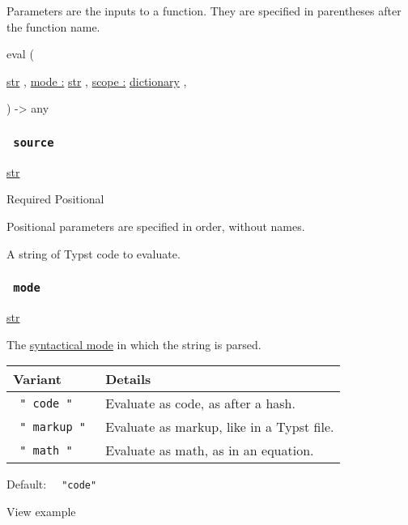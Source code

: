 \label{parameters-tooltip}
Parameters are the inputs to a function. They are specified in
parentheses after the function name.

{ eval } (

{ \href{/docs/reference/foundations/str/}{str} , } {
\hyperref[parameters-mode]{mode :}
\href{/docs/reference/foundations/str/}{str} , } {
\hyperref[parameters-scope]{scope :}
\href{/docs/reference/foundations/dictionary/}{dictionary} , }

) -\textgreater{} { any }

\subsubsection{\texorpdfstring{\texttt{\ source\ }}{ source }}\label{parameters-source}

\href{/docs/reference/foundations/str/}{str}

{Required} {{ Positional }}

\label{parameters-source-positional-tooltip}
Positional parameters are specified in order, without names.

A string of Typst code to evaluate.

\subsubsection{\texorpdfstring{\texttt{\ mode\ }}{ mode }}\label{parameters-mode}

\href{/docs/reference/foundations/str/}{str}

The \href{/docs/reference/syntax/\#modes}{syntactical mode} in which the
string is parsed.

\begin{longtable}[]{@{}ll@{}}
\toprule\noalign{}
Variant & Details \\
\midrule\noalign{}
\endhead
\bottomrule\noalign{}
\endlastfoot
\texttt{\ "\ code\ "\ } & Evaluate as code, as after a hash. \\
\texttt{\ "\ markup\ "\ } & Evaluate as markup, like in a Typst file. \\
\texttt{\ "\ math\ "\ } & Evaluate as math, as in an equation. \\
\end{longtable}

Default: \texttt{\ }{\texttt{\ "code"\ }}\texttt{\ }


View example

